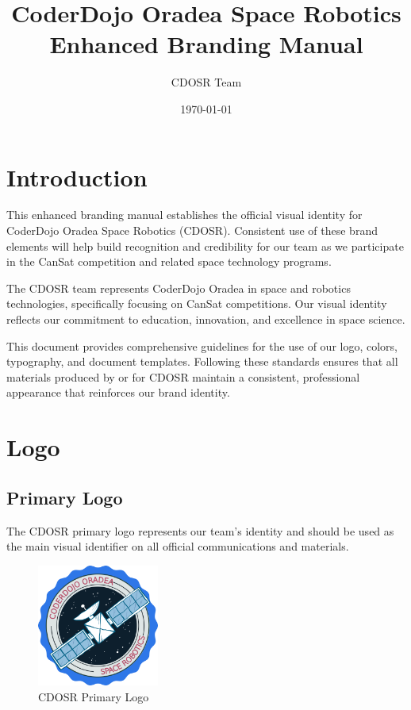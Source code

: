 \documentclass[11pt]{article}
\title{CoderDojo Oradea Space Robotics\\Enhanced Branding Manual}
\author{CDOSR Team}
\date{\today}
\begin{document}

\newpage
\tableofcontents
\pagestyle{plain}

\newpage
\section{Introduction}

This enhanced branding manual establishes the official visual identity for CoderDojo Oradea Space Robotics (CDOSR). Consistent use of these brand elements will help build recognition and credibility for our team as we participate in the CanSat competition and related space technology programs.

The CDOSR team represents CoderDojo Oradea in space and robotics technologies, specifically focusing on CanSat competitions. Our visual identity reflects our commitment to education, innovation, and excellence in space science.

This document provides comprehensive guidelines for the use of our logo, colors, typography, and document templates. Following these standards ensures that all materials produced by or for CDOSR maintain a consistent, professional appearance that reinforces our brand identity.

\section{Logo}

\subsection{Primary Logo}

The CDOSR primary logo represents our team's identity and should be used as the main visual identifier on all official communications and materials.

\begin{figure}[h]
    \centering
    \includegraphics[width=4cm]{img_CDOSR.png}
    \caption{\small{CDOSR Primary Logo}}
    \label{fig:primary-logo}
\end{figure}
\end{document}

